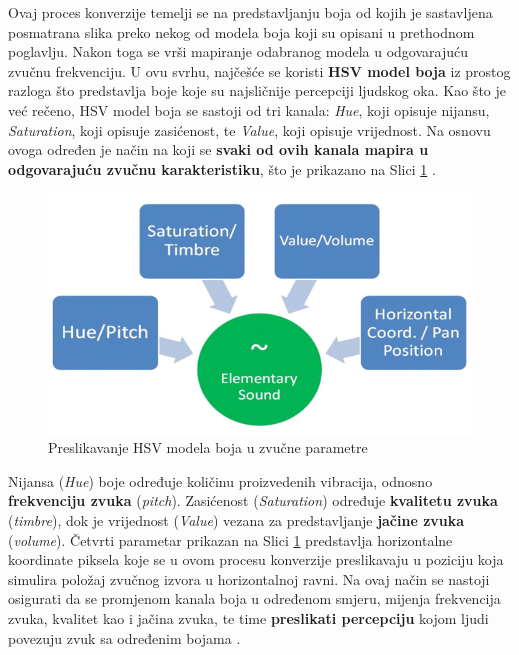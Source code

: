 \documentclass[12pt,a4paper]{article}
\begin{document}
Ovaj proces konverzije temelji se na predstavljanju boja od kojih je sastavljena posmatrana slika preko nekog od modela boja koji su opisani u prethodnom poglavlju. Nakon toga se vrši mapiranje odabranog modela u odgovarajuću zvučnu frekvenciju. U ovu svrhu, najčešće se koristi \textbf{HSV model boja} iz prostog razloga što predstavlja boje koje su najsličnije percepciji ljudskog oka. Kao što je već rečeno, HSV model boja se sastoji od tri kanala: \textit{Hue}, koji opisuje nijansu, \textit{Saturation}, koji opisuje zasićenost, te \textit{Value}, koji opisuje vrijednost. Na osnovu ovoga određen je način na koji se \textbf{svaki od ovih kanala mapira u odgovarajuću zvučnu karakteristiku}, što je prikazano na Slici \ref{HSVtoSound} \cite{n1}.

\begin{figure}[H]

\center
\includegraphics[scale=0.6]{../res/HSVtoSound.PNG}
\caption{Preslikavanje HSV modela boja u zvučne parametre \cite{n4}}
\label{HSVtoSound}

\end{figure}

Nijansa (\textit{Hue}) boje određuje količinu proizvedenih vibracija, odnosno \textbf{frekvenciju zvuka} (\textit{pitch}). Zasićenost (\textit{Saturation}) određuje \textbf{kvalitetu zvuka} (\textit{timbre}), dok je vrijednost (\textit{Value}) vezana za predstavljanje \textbf{jačine zvuka} (\textit{volume}). Četvrti parametar prikazan na Slici \ref{HSVtoSound} predstavlja horizontalne koordinate piksela koje se u ovom procesu konverzije preslikavaju u poziciju koja simulira položaj zvučnog izvora u horizontalnoj ravni. Na ovaj način se nastoji osigurati da se promjenom kanala boja u određenom smjeru, mijenja frekvencija zvuka, kvalitet kao i jačina zvuka, te time \textbf{preslikati percepciju} kojom ljudi povezuju zvuk sa određenim bojama \cite{n2}. \\
\end{document}
